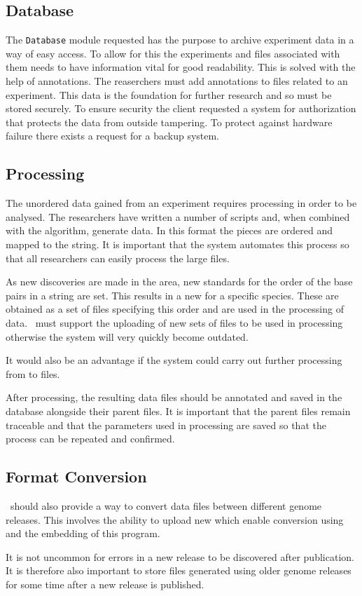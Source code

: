 \subsection{Database}
The \texttt{Database} module requested has the purpose to archive experiment data in a way of easy access. To allow for this the experiments and files associated with them needs to have information vital for good readability. This is solved with the help of annotations. The reaserchers must add annotations to files related to an experiment.
This data is the foundation for further research and so must be stored securely. To ensure security the client requested a system for authorization that protects the data from outside tampering. To protect against hardware failure there exists a request for a backup system.

\subsection{Processing}
The unordered  data gained from an experiment requires processing in order to be analysed. The researchers have written a number of scripts and, when combined with the  algorithm, generate  data. In this format the  pieces are ordered and mapped to the  string. It is important that the system automates this process so that all researchers can easily process the large  files.

As new discoveries are made in the area, new standards for the order of the base pairs in a  string are set. This results in a new  for a specific species. These are obtained as a set of files specifying this order and are used in the processing of  data. \appName\ must support the uploading of new sets of  files to be used in processing otherwise the system will very quickly become outdated. 

It would also be an advantage if the system could carry out further processing from  to  files.

After processing, the resulting data files should be annotated and saved in the database alongside their parent files. It is important that the parent files remain traceable and that the parameters used in processing are saved so that the process can be repeated and confirmed.

\subsection{Format Conversion}
\appName\ should also provide a way to convert  data files between different genome releases. This involves the ability to upload new  which enable conversion using  and the embedding of this program.

It is not uncommon for errors in a new release to be discovered after publication. It is therefore also important to store files generated using older genome releases for some time after a new release is published.

